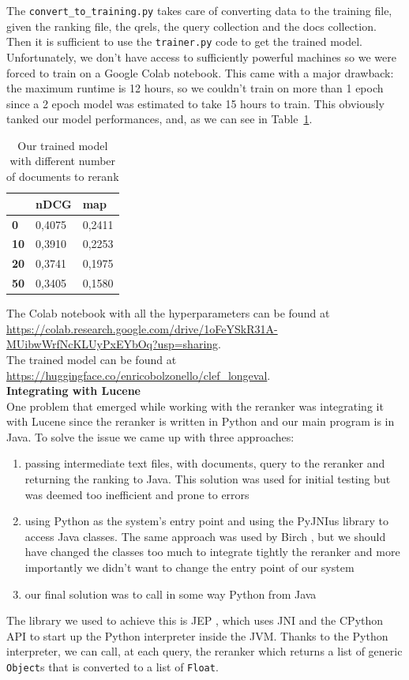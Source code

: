 The \texttt{convert\_to\_training.py} takes care of converting data to the training file, given the ranking file, the qrels, the query collection and the docs collection. Then it is sufficient to use the \texttt{trainer.py} code to get the trained model. Unfortunately, we don't have access to sufficiently powerful machines so we were forced to train on a Google Colab notebook. This came with a major drawback: the maximum runtime is 12 hours, so we couldn't train on more than 1 epoch since a 2 epoch model was estimated to take 15 hours to train. This obviously tanked our model performances, and, as we can see in Table~\ref{tab:own-model}.

\begin{table}[!h]
\caption{\label{tab:own-model}Our trained model with different number of documents to rerank}
\begin{tabular}{|l|l|l|}
\toprule
             & \textbf{nDCG} & \textbf{map} \\
\midrule
\textbf{0}   & 0,4075        & 0,2411       \\ 
\textbf{10}  & 0,3910         & 0,2253       \\ 
\textbf{20}  & 0,3741       & 0,1975       \\ 
\textbf{50}  & 0,3405        & 0,1580        \\ 
\bottomrule
\end{tabular}
\end{table}

\noindent The Colab notebook with all the hyperparameters can be found at \url{https://colab.research.google.com/drive/1oFeYSkR31A-MUibwWrfNcKLUyPxEYbOq?usp=sharing}. \\
The trained model can be found at \url{https://huggingface.co/enricobolzonello/clef_longeval}.\\

\noindent \textbf{Integrating with Lucene}\\
One problem that emerged while working with the reranker was integrating it with Lucene since the reranker is written in Python and our main program is in Java. To solve the issue we came up with three approaches: 
\begin{enumerate}
\item passing intermediate text files, with documents, query to the reranker and returning the ranking to Java. This solution was used for initial testing but was deemed too inefficient and prone to errors
\item using Python as the system's entry point and using the PyJNIus library\cite{pyjnius} to access Java classes. The same approach was used by Birch \cite{Birch}, but we should have changed the classes too much to integrate tightly the reranker and more importantly we didn't want to change the entry point of our system 
\item our final solution was to call in some way Python from Java
\end{enumerate}
The library we used to achieve this is JEP \cite{jep}, which uses \ac{JNI} and the CPython API to start up the Python interpreter inside the \ac{JVM}. Thanks to the Python interpreter, we can call, at each query, the reranker which returns a list of generic \texttt{Object}s that is converted to a list of \texttt{Float}.